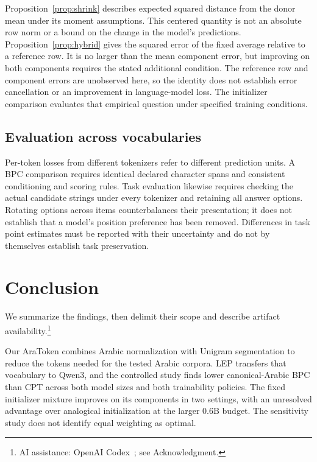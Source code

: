 \documentclass{ieeeaccess}
\begin{document}
Proposition~\ref{prop:shrink} describes expected squared distance from the
donor mean under its moment assumptions. This centered quantity is not an
absolute row norm or a bound on the change in the model's predictions.
Proposition~\ref{prop:hybrid} gives the squared error of the fixed average
relative to a reference row. It is no larger than the mean component error,
but improving on both components requires the stated additional condition.
The reference row and component errors are unobserved here, so the identity
does not establish error cancellation or an improvement in language-model
loss. The initializer comparison evaluates that empirical question under
specified training conditions.

\subsection{Evaluation across vocabularies}

Per-token losses from different tokenizers refer to different prediction
units. A BPC comparison requires identical declared character spans and
consistent conditioning and scoring rules. Task evaluation likewise requires
checking the actual candidate strings under every tokenizer and retaining
all answer options. Rotating options across items counterbalances their
presentation; it does not establish that a model's position preference has
been removed. Differences in task point estimates must be reported with
their uncertainty and do not by themselves establish task preservation.

\section{Conclusion}
\label{sec:conclusion}

We summarize the findings, then delimit their scope and describe artifact availability.\footnote{AI assistance: OpenAI Codex~\cite{openaicodex2026}; see Acknowledgment.}

Our AraToken combines Arabic normalization with Unigram segmentation to
reduce the tokens needed for the tested Arabic corpora. LEP transfers
that vocabulary to Qwen3, and the controlled study finds lower
canonical-Arabic BPC than CPT across both model sizes and both
trainability policies. The fixed initializer mixture improves on its
components in two settings, with an unresolved advantage over analogical
initialization at the larger 0.6B budget. The sensitivity study does not
identify equal weighting as optimal.
\end{document}
